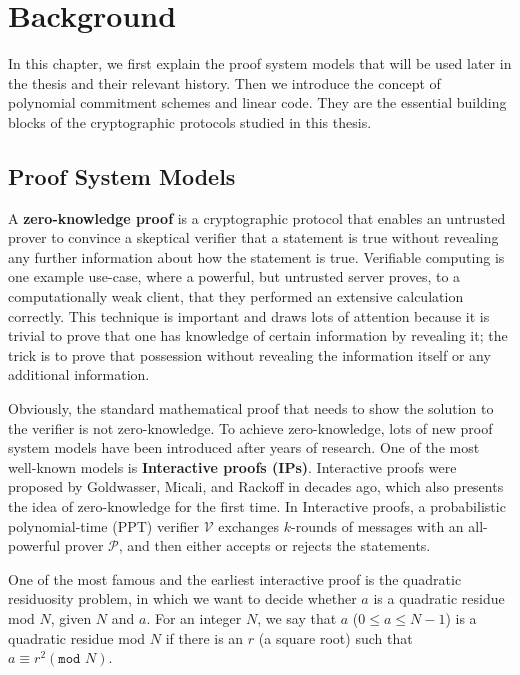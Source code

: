 \chapter{Background}

In this chapter, we first explain the proof system models that will be used later in the thesis and their relevant history. Then we introduce the concept of polynomial commitment schemes and linear code. They are the essential building blocks of the cryptographic protocols studied in this thesis.

\section{Proof System Models}

A \textbf{zero-knowledge proof} is a cryptographic protocol that enables an untrusted prover to convince a skeptical verifier that a statement is true without revealing any further information about how the statement is true. 
Verifiable computing is one example use-case, where a powerful, but untrusted server proves, to a computationally weak client, that they performed an extensive calculation correctly.
This technique is important and draws lots of attention because it is trivial to prove that one has knowledge of certain information by revealing it; the trick is to prove that possession without revealing the information itself or any additional information. 



Obviously, the standard mathematical proof that needs to show the solution to the verifier is not zero-knowledge.
To achieve zero-knowledge, lots of new proof system models have been introduced after years of research. One of the most well-known models is \textbf{Interactive proofs (IPs)}. Interactive proofs were proposed by Goldwasser, Micali, and Rackoff in \cite{DBLP:books/acm/19/GoldwasserMR19} decades ago, which also presents the idea of zero-knowledge for the first time. In Interactive proofs, a probabilistic polynomial-time (PPT) verifier $\mathcal{V}$ exchanges $k$-rounds of messages with an all-powerful prover $\mathcal{P}$, and then either accepts or rejects the statements.

One of the most famous and the earliest interactive proof is the quadratic residuosity problem, in which we want to decide whether $a$ is a quadratic residue mod $N$, given $N$ and $a$. For an integer $N$, we say that $a$ ($0 \le a \le N - 1$) is a quadratic residue mod $N$ if there is an $r$ (a square root) such that $ a \equiv r^2 ( \texttt{mod } N)$. 

